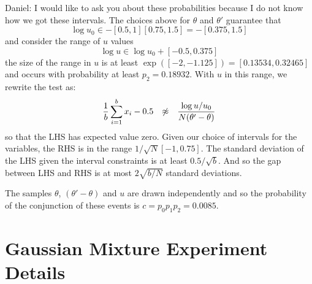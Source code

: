 \documentclass{article}
\begin{document}
{\color{blue} Daniel: I would like to ask you about these probabilities because
I do not know how we got these intervals.} The choices above for $\theta$ and
$\theta'$ guarantee that
\begin{equation}
    \log u_0 \in -[0.5,1][0.75,1.5] = -[0.375,1.5]
\end{equation}
and consider the range of $u$ values
\begin{equation}
    \log u \in \log u_0 + [-0.5,0.375]
\end{equation}
the size of the range in $u$ is at least $\exp([-2,-1.125]) = [0.13534,0.32465]$ and occurs
with probability at least $p_2=0.18932$. With $u$ in this range, we rewrite the test as:
\begin{equation}
    \frac{1}{b}\sum_{i=1}^b x_i-0.5 \hspace{0.1in} \not\approx \hspace{0.1in} \frac{\log u/u_0}{N(\theta'-\theta)}
\end{equation}
so that the LHS has expected value zero.  Given our choice of intervals for the
variables, the RHS is in the range $1/\sqrt{N}[-1,0.75]$.  The standard
deviation of the LHS given the interval constraints is at least $0.5/\sqrt{b}$.
And so the gap between LHS and RHS is at most $2\sqrt{b/N}$ standard deviations. 

The samples $\theta$, $(\theta'-\theta)$ and $u$ are drawn independently and so
the probability of the conjunction of these events is $c = p_0 p_1 p_2 =
0.0085$.



\section{Gaussian Mixture Experiment Details}\label{app:gaussian}
\end{document}
